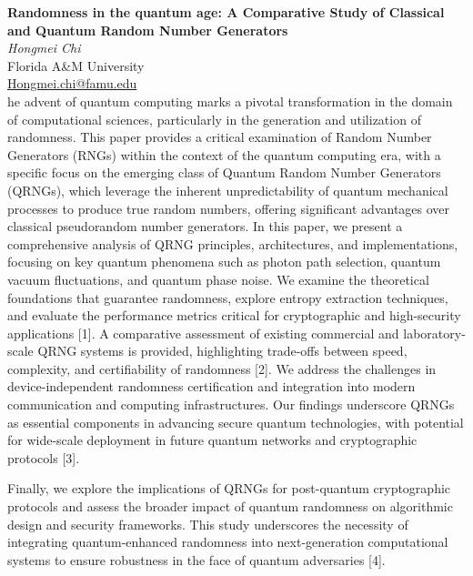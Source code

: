 \documentclass[12pt,a4paper,figuresright]{book}
\newenvironment{talk}[6]%
 {%
  \vskip 0pt\nopagebreak%
 \vskip 0pt\nopagebreak%
  \textbf{#1}\vspace{3mm}\\\nopagebreak%
  \textit{#2}\\\nopagebreak%
  #3\\\nopagebreak%
  \url{#4}\vspace{3mm}\\\nopagebreak%
  \ifthenelse{\equal{#5}{}}{}{Coauthor(s): #5\vspace{3mm}\\\nopagebreak}%
  \ifthenelse{\equal{#6}{}}{}{Special session: #6\quad \vspace{3mm}\\\nopagebreak}%
 }
 {\vspace{1cm}\nopagebreak}%
\begin{document}
\begin{talk}
  {Randomness in the quantum age: A Comparative Study of Classical and Quantum Random Number Generators}%
  {Hongmei Chi}%
  {Florida A\&M University}%
  {Hongmei.chi@famu.edu}%
 {}%
The advent of quantum computing marks a pivotal transformation in the domain of computational sciences, particularly in the generation and utilization of randomness. This paper provides a critical examination of Random Number Generators (RNGs) within the context of the quantum computing era, with a specific focus on the emerging class of Quantum Random Number Generators (QRNGs), which leverage the inherent unpredictability of quantum mechanical processes to produce true random numbers, offering significant advantages over classical pseudorandom number generators. 
In this paper, we present a comprehensive analysis of QRNG principles, architectures, and implementations, focusing on key quantum phenomena such as photon path selection, quantum vacuum fluctuations, and quantum phase noise. We examine the theoretical foundations that guarantee randomness, explore entropy extraction techniques, and evaluate the performance metrics critical for cryptographic and high-security applications [1]. A comparative assessment of existing commercial and laboratory-scale QRNG systems is provided, highlighting trade-offs between speed, complexity, and certifiability of randomness [2].  We address the challenges in device-independent randomness certification and integration into modern communication and computing infrastructures. Our findings underscore QRNGs as essential components in advancing secure quantum technologies, with potential for wide-scale deployment in future quantum networks and cryptographic protocols [3].

 Finally, we explore the implications of QRNGs for post-quantum cryptographic protocols and assess the broader impact of quantum randomness on algorithmic design and security frameworks. This study underscores the necessity of integrating quantum-enhanced randomness into next-generation computational systems to ensure robustness in the face of quantum adversaries [4].


\end{talk}
\end{document}
